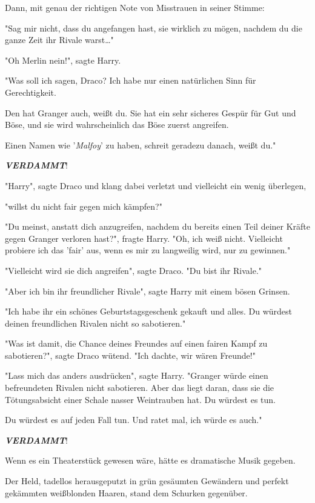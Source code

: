 {Dann, mit genau der richtigen Note von Misstrauen in seiner Stimme:

"Sag mir nicht, dass du angefangen hast, sie wirklich zu mögen, nachdem du die ganze Zeit ihr Rivale warst…"

"Oh Merlin nein!", sagte Harry.

"Was soll ich sagen, Draco? Ich habe nur einen natürlichen Sinn für Gerechtigkeit.

Den hat Granger auch, weißt du. Sie hat ein sehr sicheres Gespür für Gut und Böse, und sie wird wahrscheinlich das Böse zuerst angreifen.

Einen Namen wie '\emph{Malfoy}' zu haben, schreit geradezu danach, weißt du."

\textbf{\emph{VERDAMMT}}!

"Harry", sagte Draco und klang dabei verletzt und vielleicht ein wenig überlegen,

"willst du nicht fair gegen mich kämpfen?"

"Du meinst, anstatt dich anzugreifen, nachdem du bereits einen Teil deiner Kräfte gegen Granger verloren hast?", fragte Harry. "Oh, ich weiß nicht. Vielleicht probiere ich das 'fair' aus, wenn es mir zu langweilig wird, nur zu gewinnen."

"Vielleicht wird sie dich angreifen", sagte Draco. "Du bist ihr Rivale."

"Aber ich bin ihr freundlicher Rivale", sagte Harry mit einem bösen Grinsen.

"Ich habe ihr ein schönes Geburtstagsgeschenk gekauft und alles. Du würdest deinen freundlichen Rivalen nicht so sabotieren."

"Was ist damit, die Chance deines Freundes auf einen fairen Kampf zu sabotieren?", sagte Draco wütend. "Ich dachte, wir wären Freunde!"

"Lass mich das anders ausdrücken", sagte Harry. "Granger würde einen befreundeten Rivalen nicht sabotieren. Aber das liegt daran, dass sie die Tötungsabsicht einer Schale nasser Weintrauben hat. Du würdest es tun.

Du würdest es auf jeden Fall tun. Und ratet mal, ich würde es auch."

\textbf{\emph{VERDAMMT}}!

Wenn es ein Theaterstück gewesen wäre, hätte es dramatische Musik gegeben.

Der Held, tadellos herausgeputzt in grün gesäumten Gewändern und perfekt gekämmten weißblonden Haaren, stand dem Schurken gegenüber.

}
